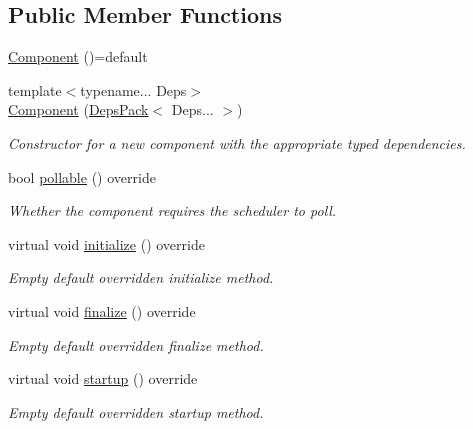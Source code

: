 \subsection*{Public Member Functions}
\begin{DoxyCompactItemize}
\item 
\hyperlink{structvt_1_1runtime_1_1component_1_1_component_ab954824329584814bb652ea810cd62e3}{Component} ()=default
\item 
{\footnotesize template$<$typename... Deps$>$ }\\\hyperlink{structvt_1_1runtime_1_1component_1_1_component_a1a94c1d493860adff6ae69c5eb31bb3f}{Component} (\hyperlink{structvt_1_1runtime_1_1component_1_1_base_component_1_1_deps_pack}{Deps\+Pack}$<$ Deps... $>$)
\begin{DoxyCompactList}\small\item\em Constructor for a new component with the appropriate typed dependencies. \end{DoxyCompactList}\item 
bool \hyperlink{structvt_1_1runtime_1_1component_1_1_component_a5a15bd0369a9d3765a6c70249bada96f}{pollable} () override
\begin{DoxyCompactList}\small\item\em Whether the component requires the scheduler to poll. \end{DoxyCompactList}\item 
virtual void \hyperlink{structvt_1_1runtime_1_1component_1_1_component_a7f07384d294e59796add9ce6be2d6410}{initialize} () override
\begin{DoxyCompactList}\small\item\em Empty default overridden initialize method. \end{DoxyCompactList}\item 
virtual void \hyperlink{structvt_1_1runtime_1_1component_1_1_component_a098e362de01af6054e5491fba671a959}{finalize} () override
\begin{DoxyCompactList}\small\item\em Empty default overridden finalize method. \end{DoxyCompactList}\item 
virtual void \hyperlink{structvt_1_1runtime_1_1component_1_1_component_aad3974307ab3b2e1df389a91310f68c2}{startup} () override
\begin{DoxyCompactList}\small\item\em Empty default overridden startup method. \end{DoxyCompactList}\item 

\end{DoxyCompactItemize}
